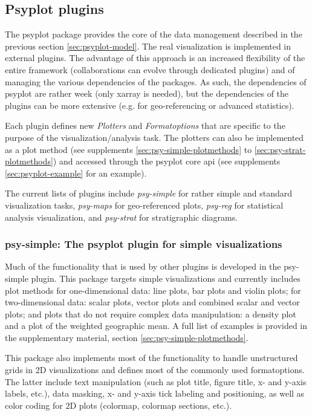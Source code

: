 \begin{refsection}
\subsection{Psyplot plugins}  \label{sec:psyplot-plugins}

The psyplot package provides the core of the data management described in the previous section \ref{sec:psyplot-model}. The real visualization is implemented in external plugins. The advantage of this approach is an increased flexibility of the entire framework (collaborations can evolve through dedicated plugins) and of managing the various dependencies of the packages. As such, the dependencies of psyplot are rather week (only xarray is needed), but the dependencies of the plugins can be more extensive (e.g. for geo-referencing or advanced statistics). 

Each plugin defines new \textit{Plotters} and \textit{Formatoptions} that are specific to the purpose of the visualization/analysis task. The plotters can also be implemented as a plot method (see supplements \ref{sec:psy-simple-plotmethods} to \ref{sec:psy-strat-plotmethods}) and accessed through the psyplot core \gls{api} (see supplements \ref{sec:psyplot-example} for an example).

The current lists of plugins include \textit{psy-simple} for rather simple and standard visualization tasks, \textit{psy-maps} for geo-referenced plots, \textit{psy-reg} for statistical analysis visualization, and \textit{psy-strat} for stratigraphic diagrams.

\subsubsection{psy-simple: The psyplot plugin for simple visualizations}

Much of the functionality that is used by other plugins is developed in the psy-simple plugin. This package targets simple visualizations and currently includes plot methods for one-dimensional data: line plots, bar plots and violin plots; for two-dimensional data: scalar plots, vector plots and combined scalar and vector plots; and plots that do not require complex data manipulation: a density plot and a plot of the weighted geographic mean. A full list of examples is provided in the supplementary material, section \ref{sec:psy-simple-plotmethods}.

This package also implements most of the functionality to handle unstructured grids in 2D visualizations and defines most of the commonly used formatoptions. The latter include text manipulation (such as plot title, figure title, x- and y-axis labels, etc.), data masking, x- and y-axis tick labeling and positioning, as well as color coding for 2D plots (colormap, colormap sections, etc.).


\end{refsection}
